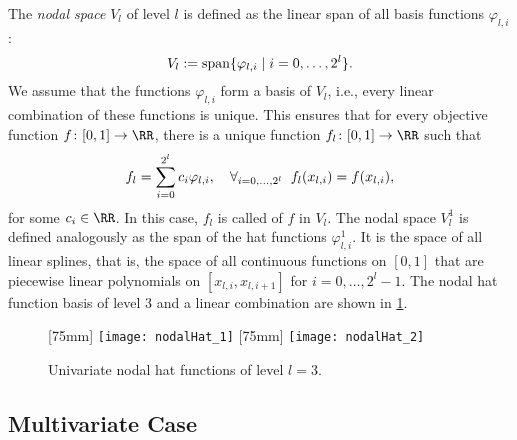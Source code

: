 %
%
The \emph{nodal space} $V_l$ of level $l$
is defined as the linear span of all basis functions
$\varphi_{l,i}$:
\begin{equation}
  V_l := \operatorname{span}\{\varphi_{l,i} \mid i = 0, \dotsc, 2^l\}.
\end{equation}
We assume that the functions $\varphi_{l,i}$ form a basis of $V_l$, i.e.,
every linear combination of these functions is unique.
%
%
This ensures that for every objective function $f\colon [0, 1] \to \RR$,
there is a unique function $f_l\colon [0, 1] \to \RR$ such that
\begin{equation}
  \label{eq:interpFullGridUV}
  f_l
  = \sum_{i=0}^{2^l} c_i \varphi_{l,i},\quad
  \forall_{i = 0, \dotsc, 2^l}\;\;f_l(x_{l,i}) = f(x_{l,i}),
\end{equation}
for some $c_i \in \RR$.
In this case, $f_l$ is called  of $f$ in $V_l$.
The nodal space $V_l^1$ is defined analogously as the span of the
hat functions $\varphi_{l,i}^1$.
It is the space of all linear splines,
that is, the space of all continuous functions on $[0, 1]$ that are
piecewise linear polynomials on $[x_{l,i}, x_{l,i+1}]$ for
$i = 0, \dotsc, 2^l - 1$.
The nodal hat function basis of level $3$
and a linear combination are shown in \cref{fig:nodalHat}.

\begin{figure}
  [75mm]{%
    \texttt{[image: nodalHat\_1]}%
  }%
  \hfill%
  [75mm]{%
    \texttt{[image: nodalHat\_2]}%
  }%
  \caption{Univariate nodal hat functions of level $l = 3$.}
  \label{fig:nodalHat}
\end{figure}

\subsection{Multivariate Case}

